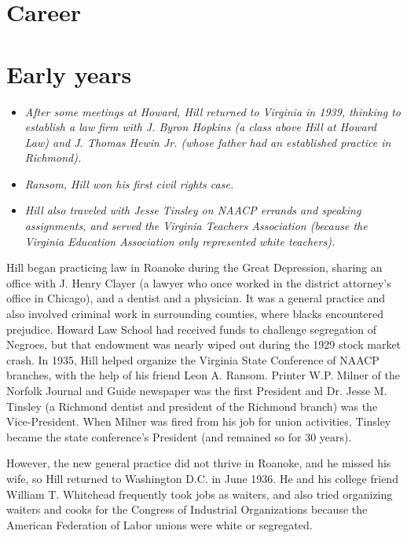 \section{Career}\label{career}

\section{Early years}\label{early-years}

\begin{itemize}
\item
  \emph{After some meetings at Howard, Hill returned to Virginia in
  1939, thinking to establish a law firm with J. Byron Hopkins (a class
  above Hill at Howard Law) and J. Thomas Hewin Jr. (whose father had an
  established practice in Richmond).}
\item
  \emph{Ransom, Hill won his first civil rights case.}
\item
  \emph{Hill also traveled with Jesse Tinsley on NAACP errands and
  speaking assignments, and served the Virginia Teachers Association
  (because the Virginia Education Association only represented white
  teachers).}
\end{itemize}

Hill began practicing law in Roanoke during the Great Depression,
sharing an office with J. Henry Clayer (a lawyer who once worked in the
district attorney's office in Chicago), and a dentist and a physician.
It was a general practice and also involved criminal work in surrounding
counties, where blacks encountered prejudice. Howard Law School had
received funds to challenge segregation of Negroes, but that endowment
was nearly wiped out during the 1929 stock market crash. In 1935, Hill
helped organize the Virginia State Conference of NAACP branches, with
the help of his friend Leon A. Ransom. Printer W.P. Milner of the
Norfolk Journal and Guide newspaper was the first President and Dr.
Jesse M. Tinsley (a Richmond dentist and president of the Richmond
branch) was the Vice-President. When Milner was fired from his job for
union activities, Tinsley became the state conference's President (and
remained so for 30 years).

However, the new general practice did not thrive in Roanoke, and he
missed his wife, so Hill returned to Washington D.C. in June 1936. He
and his college friend William T. Whitehead frequently took jobs as
waiters, and also tried organizing waiters and cooks for the Congress of
Industrial Organizations because the American Federation of Labor unions
were white or segregated.

